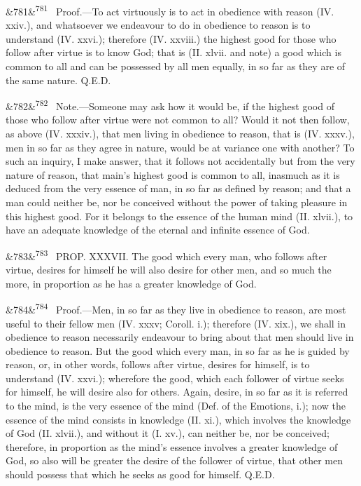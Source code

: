 \documentclass[12pt]{article}
\newcommand{\para}[1][]{\par\noindent\ifx&#1&\else\textsuperscript{\footnotesize #1}~\fi}
\begin{document}
\para[781] Proof.---To act virtuously is to act in obedience with reason (IV. xxiv.), and whatsoever we endeavour to do in obedience to reason is to understand (IV. xxvi.); therefore (IV. xxviii.) the highest good for those who follow after virtue is to know God; that is (II. xlvii. and note) a good which is common to all and can be possessed by all men equally, in so far as they are of the same nature. Q.E.D.

\para[782] Note.---Someone may ask how it would be, if the highest good of those who follow after virtue were not common to all? Would it not then follow, as above (IV. xxxiv.), that men living in obedience to reason, that is (IV. xxxv.), men in so far as they agree in nature, would be at variance one with another? To such an inquiry, I make answer, that it follows not accidentally but from the very nature of reason, that main's highest good is common to all, inasmuch as it is deduced from the very essence of man, in so far as defined by reason; and that a man could neither be, nor be conceived without the power of taking pleasure in this highest good. For it belongs to the essence of the human mind (II. xlvii.), to have an adequate knowledge of the eternal and infinite essence of God.

\para[783] PROP. XXXVII. The good which every man, who follows after virtue, desires for himself he will also desire for other men, and so much the more, in proportion as he has a greater knowledge of God.

\para[784] Proof.---Men, in so far as they live in obedience to reason, are most useful to their fellow men (IV. xxxv; Coroll. i.); therefore (IV. xix.), we shall in obedience to reason necessarily endeavour to bring about that men should live in obedience to reason. But the good which every man, in so far as he is guided by reason, or, in other words, follows after virtue, desires for himself, is to understand (IV. xxvi.); wherefore the good, which each follower of virtue seeks for himself, he will desire also for others. Again, desire, in so far as it is referred to the mind, is the very essence of the mind (Def. of the Emotions, i.); now the essence of the mind consists in knowledge (II. xi.), which involves the knowledge of God (II. xlvii.), and without it (I. xv.), can neither be, nor be conceived; therefore, in proportion as the mind's essence involves a greater knowledge of God, so also will be greater the desire of the follower of virtue, that other men should possess that which he seeks as good for himself. Q.E.D.
\end{document}
